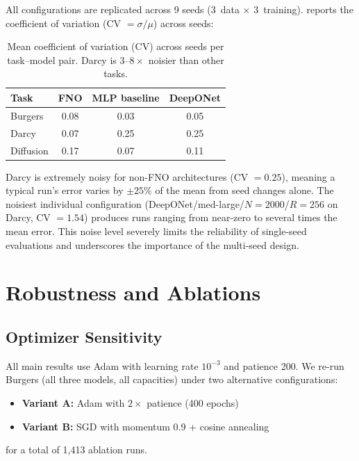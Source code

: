 \documentclass[11pt]{article}
\begin{document}
All configurations are replicated across 9 seeds
(3~data $\times$ 3~training).  reports the
coefficient of variation (CV $= \sigma / \mu$) across seeds:

\begin{table}[h]
\centering
\caption{Mean coefficient of variation (CV) across seeds per
task--model pair. Darcy is $3$--$8\times$ noisier than other tasks.}
\label{tab:noise}
\begin{tabular}{@{}lccc@{}}
\toprule
\textbf{Task} & \textbf{FNO} & \textbf{MLP baseline} &
\textbf{DeepONet} \\
\midrule
Burgers   & 0.08 & 0.03 & 0.05 \\
Darcy     & 0.07 & 0.25 & 0.25 \\
Diffusion & 0.17 & 0.07 & 0.11 \\
\bottomrule
\end{tabular}
\end{table}

Darcy is extremely noisy for non-FNO architectures (CV $= 0.25$),
meaning a typical run's error varies by $\pm 25\%$ of the mean
from seed changes alone. The noisiest individual configuration
(DeepONet/med-large/$N = 2000$/$R = 256$ on Darcy, CV $= 1.54$)
produces runs ranging from near-zero to several times the mean
error. This noise level severely limits the reliability of
single-seed evaluations and underscores the importance of the
multi-seed design.


\section{Robustness and Ablations}
\label{sec:ablations}

\subsection{Optimizer Sensitivity}
\label{sec:optimizer}

All main results use Adam with learning rate $10^{-3}$ and patience
200. We re-run Burgers (all three models, all capacities) under two
alternative configurations:
\begin{itemize}[leftmargin=*,itemsep=2pt]
  \item \textbf{Variant A:} Adam with $2\times$ patience (400 epochs)
  \item \textbf{Variant B:} SGD with momentum 0.9 + cosine annealing
\end{itemize}
for a total of 1{,}413 ablation runs.
\end{document}
